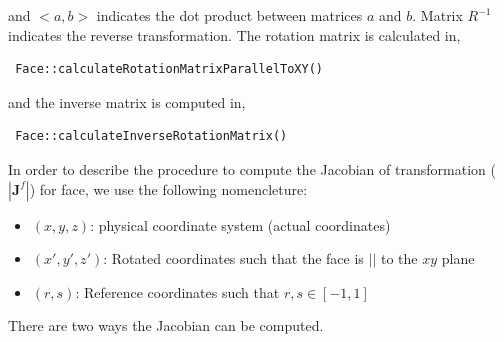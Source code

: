  and $<a,b>$ indicates the dot product between matrices $a$ and $b$. 
 Matrix $R^{-1}$ indicates the reverse transformation.
 The rotation matrix is calculated in,
 \begin{verbatim}
 Face::calculateRotationMatrixParallelToXY()
 \end{verbatim}
 and the inverse matrix is computed in,
 \begin{verbatim}
 Face::calculateInverseRotationMatrix()
 \end{verbatim}
 In order to describe the procedure to compute the Jacobian of transformation ($|{\mathbf{J}^f}|$) for face,
 we use the following nomencleture:
 \begin{itemize}
	 \item $(x,y,z)$: physical coordinate system (actual coordinates)
	 \item $(x', y', z')$: Rotated coordinates such that the face is $||$ to the $xy$ plane
	 \item $(r,s)$: Reference coordinates such that $r,s \in [-1,1]$
 \end{itemize}
 There are two ways the Jacobian can be computed.

